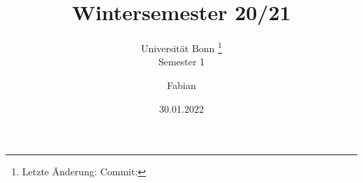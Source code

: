 \documentclass[a4paper, 10pt, oneside, openany,  bibliography=totocnumbered]{scrbook}
\begin{document}
\subject{Vorlesungsmitschriften}
\title{Wintersemester 20/21}
\subtitle{
  Universität Bonn \footnote{
    Letzte Änderung: \texttt{\gitAuthorDate}
    \hfill
    Commit: \texttt{\gitAbbrevHash}
  }
  \\
  Semester 1
}
\author{Fabian}
\date{30.01.2022}
\publishers{
  Online aufrufbar auf \texttt{\url{https://github.com/git-fabus/lecutres/blob/main/notes.pdf}.}
  \\
 Veränderungsvorschläge und Verbesserungen bitte an 
}

\frontmatter
\maketitle

\tableofcontents

\mainmatter


\appendix %
%

\backmatter
%
\end{document}
